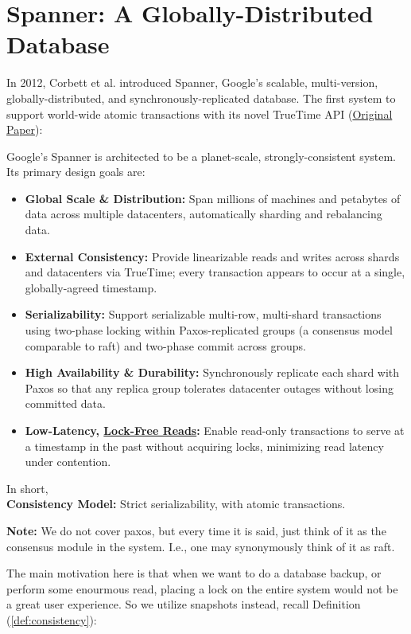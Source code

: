 \newpage
\section{Spanner: A Globally-Distributed Database}
In 2012, Corbett et al. introduced Spanner, Google's scalable, multi-version, globally-distributed, and synchronously-replicated database.
The first system to support world-wide atomic transactions with its novel TrueTime API (\href{https://static.googleusercontent.com/media/research.google.com/en//archive/spanner-osdi2012.pdf}{Original Paper}):

\vspace{2em}
\begin{Def}

    Google's Spanner is architected to be a planet-scale, strongly-consistent system.  Its primary design goals are:
    
    \begin{itemize}
      \item \textbf{Global Scale \& Distribution:} Span millions of machines and petabytes of data across multiple datacenters, automatically sharding and rebalancing data.
      \item \textbf{External Consistency:} Provide linearizable reads and writes across shards and datacenters via TrueTime; every transaction appears to occur at a single, globally-agreed timestamp.
      \item \textbf{Serializability:} Support serializable multi-row, multi-shard transactions using two-phase locking within Paxos-replicated groups (a consensus model comparable to raft) and two-phase commit across groups.
      \item \textbf{High Availability \& Durability:} Synchronously replicate each shard with Paxos so that any replica group tolerates datacenter outages without losing committed data.
      \item \textbf{Low-Latency, \underline{Lock-Free Reads}:} Enable read-only transactions to serve at a timestamp in the past without acquiring locks, minimizing read latency under contention.
    \end{itemize}

    \noindent
    In short,\\
    \textbf{Consistency Model:} Strict serializability, with atomic transactions.
    \end{Def}
    
    \begin{Note}
    \textbf{Note:} We do not cover paxos, but every time it is said, just think of it as the consensus module in the system. I.e., one may 
    synonymously think of it as raft.
    \end{Note}
    \noindent
    The main motivation here is that when we want to do a database backup, or perform some enourmous read, placing a lock on the entire system would not be a 
    great user experience. So we utilize snapshots instead, recall Definition (\ref{def:consistency}):

